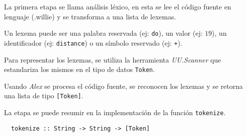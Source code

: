   La primera etapa se llama análisis léxico, en esta se lee el código
  fuente en lenguaje \frob{} (.willie) y se transforma a una
  lista de lexemas.

  Un lexema puede ser una palabra reservada (ej: \texttt{do}),
  un valor (ej: $19$), un identificador (ej: \texttt{distance}) o
  un símbolo reservado (ej: \texttt{+}).

  Para representar los lexemas, se utiliza la
  herramienta \textit{UU.Scanner}
  \cite{uuparser} que estandariza los mismos en el tipo de
  datos \texttt{Token}.

  Usando \textit{Alex}\cite{alex} se procesa el código fuente,
  se reconocen los lexemas y se retorna una lista de
  tipo \texttt{[Token]}.

  La etapa se puede resumir en la implementación de la
  función \texttt{tokenize}.

\begin{Verbatim}
  tokenize :: String -> String -> [Token]
\end{Verbatim}

